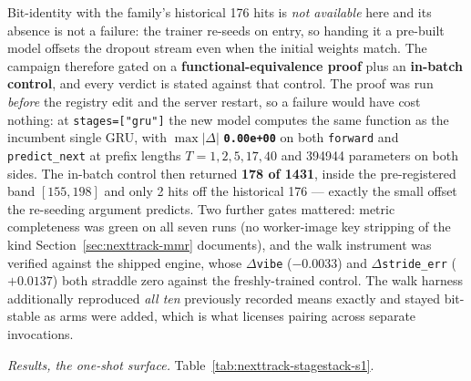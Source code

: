 \documentclass[11pt]{article}
\begin{document}
Bit-identity with the family's historical \num{176} hits is \emph{not available}
here and its absence is not a failure: the trainer re-seeds on entry, so handing it
a pre-built model offsets the dropout stream even when the initial weights match.
The campaign therefore gated on a \textbf{functional-equivalence proof} plus an
\textbf{in-batch control}, and every verdict is stated against that control. The
proof was run \emph{before} the registry edit and the server restart, so a failure
would have cost nothing: at \texttt{stages=["gru"]} the new model computes the same
function as the incumbent single GRU, with $\max|\Delta|$ \textbf{\texttt{0.00e+00}}
on both \texttt{forward} and \texttt{predict\_next} at prefix lengths
$T=1,2,5,17,40$ and \num{394944} parameters on both sides. The in-batch control
then returned \textbf{\num{178} of \num{1431}}, inside the pre-registered band
$[\num{155},\num{198}]$ and only \num{2} hits off the historical \num{176} ---
exactly the small offset the re-seeding argument predicts. Two further gates
mattered: metric completeness was green on all seven runs (no worker-image key
stripping of the kind Section~\ref{sec:nexttrack-mmr} documents), and the walk instrument
was verified against the shipped engine, whose $\Delta$\texttt{vibe}
($-\num{0.0033}$) and $\Delta$\texttt{stride\_err} ($+\num{0.0137}$) both straddle
zero against the freshly-trained control. The walk harness additionally reproduced
\emph{all ten} previously recorded means exactly and stayed bit-stable as arms were
added, which is what licenses pairing across separate invocations.

\emph{Results, the one-shot surface.} Table~\ref{tab:nexttrack-stagestack-s1}.
\end{document}
